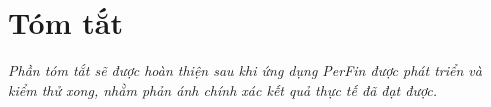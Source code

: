 \chapter*{Tóm tắt}


\textit{Phần tóm tắt sẽ được hoàn thiện sau khi ứng dụng PerFin được phát triển và kiểm thử xong, nhằm phản ánh chính xác kết quả thực tế đã đạt được.}

